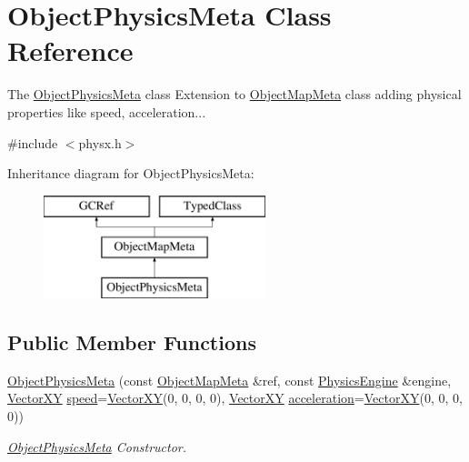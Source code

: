 \hypertarget{classObjectPhysicsMeta}{}\section{Object\+Physics\+Meta Class Reference}
\label{classObjectPhysicsMeta}


The \hyperlink{classObjectPhysicsMeta}{Object\+Physics\+Meta} class Extension to \hyperlink{classObjectMapMeta}{Object\+Map\+Meta} class adding physical properties like speed, acceleration...  




{\ttfamily \#include $<$physx.\+h$>$}

Inheritance diagram for Object\+Physics\+Meta\+:\begin{figure}[H]
\begin{center}
\leavevmode
\includegraphics[height=3.000000cm]{classObjectPhysicsMeta}
\end{center}
\end{figure}
\subsection*{Public Member Functions}
\begin{DoxyCompactItemize}
\item 
\hyperlink{classObjectPhysicsMeta_a5f9da87e92c7d03ba1213542f5d7a6c6}{Object\+Physics\+Meta} (const \hyperlink{classObjectMapMeta}{Object\+Map\+Meta} \&ref, const \hyperlink{classPhysicsEngine}{Physics\+Engine} \&engine, \hyperlink{classVectorXY}{Vector\+X\+Y} \hyperlink{classObjectPhysicsMeta_a9d6fae5e4518766e715781227e3fb9a9}{speed}=\hyperlink{classVectorXY}{Vector\+X\+Y}(0, 0, 0, 0), \hyperlink{classVectorXY}{Vector\+X\+Y} \hyperlink{classObjectPhysicsMeta_ab2ef030e0178008c40520e615790a854}{acceleration}=\hyperlink{classVectorXY}{Vector\+X\+Y}(0, 0, 0, 0))
\begin{DoxyCompactList}\small\item\em \hyperlink{classObjectPhysicsMeta}{Object\+Physics\+Meta} Constructor. \end{DoxyCompactList}\end{DoxyCompactItemize}
